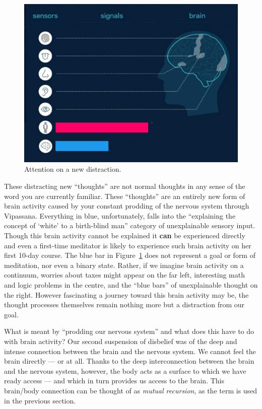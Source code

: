 \documentclass{article}
\begin{document}
\begin{figure}[h]
  \centering
  \includegraphics[width=\linewidth]{images/ma-vipassana3.png}
  \caption{Attention on a new distraction.}
  \label{fig:vipassana-sense-map-2}
\end{figure}

These distracting new ``thoughts'' are not normal thoughts in any sense of the word you are currently familiar. These ``thoughts'' are an entirely new form of brain activity caused by your constant prodding of the nervous system through Vipassana. Everything in blue, unfortunately, falls into the ``explaining the concept of `white' to a birth-blind man'' category of unexplainable sensory input. Though this brain activity cannot be explained it \textbf{can} be experienced directly and even a first-time meditator is likely to experience such brain activity on her first 10-day course. The blue bar in Figure~\ref{fig:vipassana-sense-map-2} does not represent a goal or form of meditation, nor even a binary state. Rather, if we imagine brain activity on a continuum, worries about taxes might appear on the far left, interesting math and logic problems in the centre, and the ``blue bars'' of unexplainable thought on the right. However fascinating a journey toward this brain activity may be, the thought processes themselves remain nothing more but a distraction from our goal.

What is meant by ``prodding our nervous system'' and what does this have to do with brain activity? Our second suspension of disbelief was of the deep and intense connection between the brain and the nervous system. We cannot feel the brain directly --- or at all. Thanks to the deep interconnection between the brain and the nervous system, however, the body acts as a surface to which we have ready access --- and which in turn provides us access to the brain. This brain/body connection can be thought of as \textit{mutual recursion}, as the term is used in the previous section.
\end{document}
